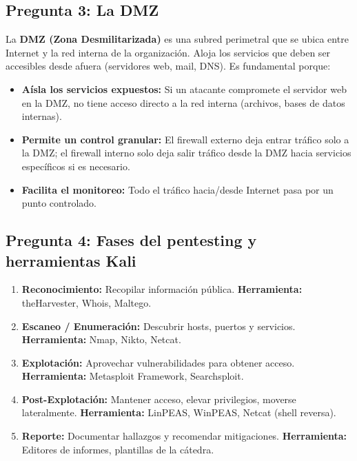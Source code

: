 \documentclass[11pt,a4paper]{article}
\begin{document}
\subsection*{Pregunta 3: La DMZ}
\begin{respuesta}
La \textbf{DMZ (Zona Desmilitarizada)} es una subred perimetral que se ubica entre Internet y la red interna de la organización. Aloja los servicios que deben ser accesibles desde afuera (servidores web, mail, DNS).
Es fundamental porque:
\begin{itemize}[leftmargin=*]
  \item \textbf{Aísla los servicios expuestos:} Si un atacante compromete el servidor web en la DMZ, no tiene acceso directo a la red interna (archivos, bases de datos internas).
  \item \textbf{Permite un control granular:} El firewall externo deja entrar tráfico solo a la DMZ; el firewall interno solo deja salir tráfico desde la DMZ hacia servicios específicos si es necesario.
  \item \textbf{Facilita el monitoreo:} Todo el tráfico hacia/desde Internet pasa por un punto controlado.
\end{itemize}
\end{respuesta}

\subsection*{Pregunta 4: Fases del pentesting y herramientas Kali}
\begin{respuesta}
\begin{enumerate}[leftmargin=*]
  \item \textbf{Reconocimiento:} Recopilar información pública. \textbf{Herramienta:} theHarvester, Whois, Maltego.
  \item \textbf{Escaneo / Enumeración:} Descubrir hosts, puertos y servicios. \textbf{Herramienta:} Nmap, Nikto, Netcat.
  \item \textbf{Explotación:} Aprovechar vulnerabilidades para obtener acceso. \textbf{Herramienta:} Metasploit Framework, Searchsploit.
  \item \textbf{Post-Explotación:} Mantener acceso, elevar privilegios, moverse lateralmente. \textbf{Herramienta:} LinPEAS, WinPEAS, Netcat (shell reversa).
  \item \textbf{Reporte:} Documentar hallazgos y recomendar mitigaciones. \textbf{Herramienta:} Editores de informes, plantillas de la cátedra.
\end{enumerate}
\end{respuesta}
\end{document}
